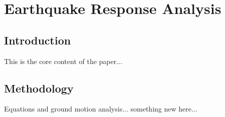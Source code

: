 \documentclass[../../main_thesis.tex]{subfiles}
\begin{document}
\chapter{Earthquake Response Analysis} %
\label{chap:paper1}

\section{Introduction}
This is the core content of the paper...

\section{Methodology}
Equations and ground motion analysis...
something new here...
\end{document}
